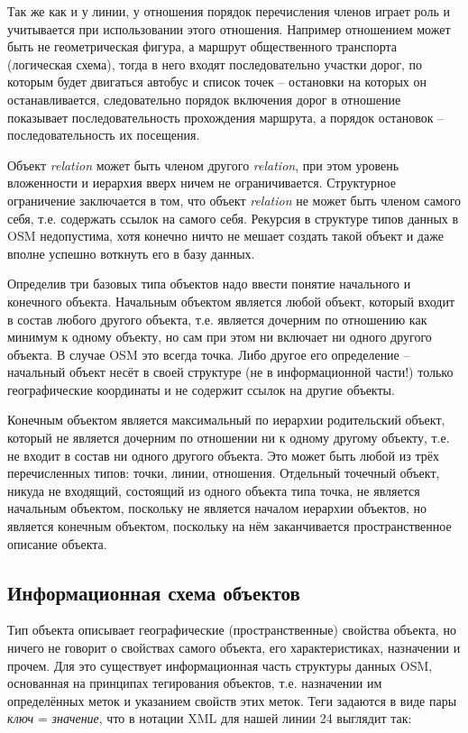Так же как и у линии, у отношения порядок перечисления членов играет роль и 
учитывается при использовании этого отношения. Например отношением может быть 
не геометрическая фигура, а маршрут общественного транспорта (логическая 
схема), тогда в него входят последовательно участки дорог, по которым будет 
двигаться автобус и список точек -- остановки на которых он останавливается, 
следовательно порядок включения дорог в отношение показывает последовательность 
прохождения маршрута, а порядок остановок -- последовательность их посещения.

Объект \emph{relation} может быть членом другого \emph{relation}, при этом 
уровень вложенности и иерархия вверх ничем не ограничивается. Структурное 
ограничение заключается в том, что объект \emph{relation} не может быть членом 
самого себя, т.е. содержать ссылок на самого себя. Рекурсия в структуре типов 
данных в OSM недопустима, хотя конечно ничто не мешает создать такой объект 
и даже вполне успешно воткнуть его в базу данных.

Определив три базовых типа объектов надо ввести понятие начального и конечного 
объекта. Начальным объектом является любой объект, который входит в состав 
любого другого объекта, т.е. является дочерним по отношению как минимум к 
одному объекту, но сам при этом ни включает ни одного другого объекта. В 
случае OSM это всегда точка. Либо другое его определение -- начальный объект 
несёт в своей структуре (не в информационной части!) только географические 
координаты и не содержит ссылок на другие объекты.

Конечным объектом является максимальный по иерархии родительский объект, 
который не является дочерним по отношении ни к одному другому объекту, т.е. не 
входит в состав ни одного другого объекта. Это может быть любой из трёх 
перечисленных типов: точки, линии, отношения. Отдельный точечный объект, 
никуда не входящий, состоящий из одного объекта типа точка, не является 
начальным объектом, поскольку не является началом иерархии объектов, но 
является конечным объектом, поскольку на нём заканчивается пространственное 
описание объекта.\cite{habrahabr02}

\subsection{Информационная схема объектов}
Тип объекта описывает географические (пространственные) свойства объекта, но 
ничего не говорит о свойствах самого объекта, его характеристиках, назначении 
и прочем. Для это существует информационная часть структуры данных OSM, 
основанная на принципах тегирования объектов, т.е. назначении им определённых 
меток и указанием свойств этих меток. Теги задаются в виде пары 
\emph{ключ} = \emph{значение}, что в нотации XML для нашей линии 24 выглядит 
так:

